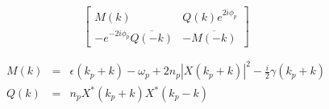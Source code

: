 \documentclass[a4paper,prb,10pt,aps,twocolumn]{revtex4-1}
\begin{document}


\begin{equation}
  \label{eq:127}
\left[\begin{matrix}M{\left (k \right )} & Q{\left (k \right )} e^{2 i \phi_{p}}\\- e^{- 2 i \phi_{p}} \overline{Q{\left (- k \right )}} & - \overline{M{\left (- k \right )}}\end{matrix}\right]
\end{equation}

\begin{subequations}
  \begin{eqnarray}
    \label{eq:148}
M(k)&=&\epsilon(k_{p}+k)-\omega_{p}+2n_{p}\left|X(k_{p}+k)\right|^{2}-\frac{i}{2}\gamma(k_{p}+k)\\
Q(k)&=&n_{p}X^{*}(k_{p}+k)X^{*}(k_{p}-k)  
  \end{eqnarray}
\end{subequations}
\end{document}
